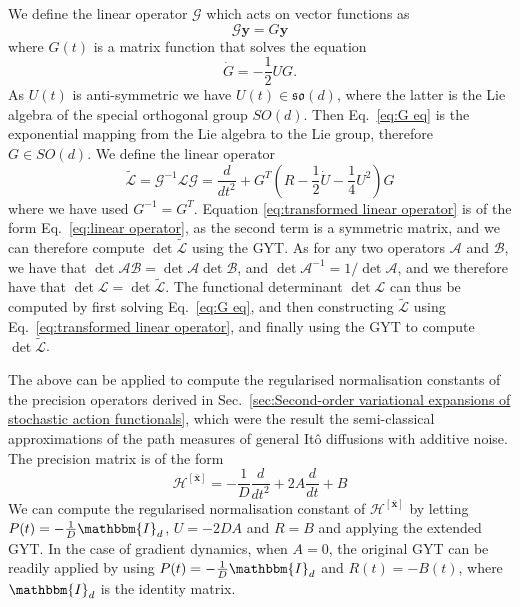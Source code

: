 \documentclass[]{cam-thesis}
\begin{document}
We define the linear operator $\mathcal{G}$ which acts on vector
functions as
\begin{equation} \label{eq:G op}
	\mathcal{G}\mathbf{y}=G\mathbf{y}
\end{equation}
where $G(t)$ is a matrix function that solves the equation
\begin{equation}
\dot{G}=-\frac{1}{2}UG.\label{eq:G eq}
\end{equation}
As $U(t)$ is anti-symmetric we have $U(t) \in \mathfrak{so}(d)$, where the latter is the Lie algebra of the special orthogonal group $SO(d)$. Then Eq.~\ref{eq:G eq} is the exponential mapping from the Lie algebra to the Lie group, therefore $G \in SO(d)$. We define the linear operator
\begin{equation} \label{eq:transformed linear operator}
\tilde{\mathcal{L}}=\mathcal{G}^{-1}\mathcal{L}\mathcal{G}=\frac{d}{dt^{2}}+G^{T}\left(R-\frac{1}{2}\dot{U}-\frac{1}{4}U^{2}\right)G
\end{equation}
where we have used $G^{-1} = G^T$. Equation \ref{eq:transformed linear operator} is of the form Eq.~\ref{eq:linear operator}, as the second term is a symmetric matrix, and we can therefore compute $\det\tilde{\mathcal{L}}$ using the GYT. As for any two operators $\mathcal{A}$
and $\mathcal{B}$, we have that $\det\mathcal{A\mathcal{B}}=\det\mathcal{A}\det\mathcal{B}$,
and $\det\mathcal{A}^{-1}=1/\det\mathcal{A}$, and we therefore have
that $\det\mathcal{L}=\det\tilde{\mathcal{L}}$. The functional determinant
$\det\mathcal{L}$ can thus be computed by first solving Eq.~\ref{eq:G eq}, and then
constructing $\tilde{\mathcal{L}}$ using Eq.~\ref{eq:transformed linear operator},
and finally using the GYT to compute $\det\tilde{\mathcal{L}}$.

The above can be applied to compute the regularised normalisation constants of the precision operators derived in Sec.~\ref{sec:Second-order variational expansions of stochastic action functionals}, which were the result the semi-classical approximations of the path measures of general It\^{o} diffusions with additive noise. The precision matrix is of the form
\begin{equation}
	\mathcal{H}^{[\bar{\mathbf{x}}]} =-\frac{1}{D} \frac{d}{dt^{2}}+2A\frac{d}{dt}+B
\end{equation}
We can compute the regularised normalisation constant of $\mathcal{H}^{[\bar{\mathbf{x}}]}$ by letting $P(t)=-\frac{1}{D} \mathbbm{I}_{d}$, $U=-2 D A$ and $R=B$ and applying the extended GYT. In the case of gradient dynamics, when $A = 0$, the original GYT can be readily applied by using $P(t)=-\frac{1}{D} \mathbbm{I}_{d}$ and $R(t)=-B(t)$, where $\mathbbm{I}_{d}$ is the identity matrix.
\end{document}
